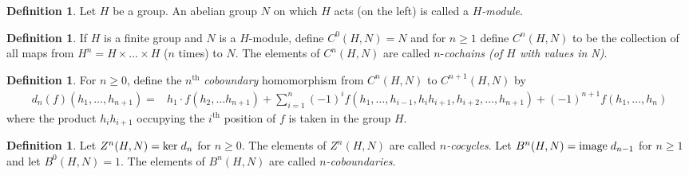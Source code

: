 \documentclass{article}
\newcommand{\Z}{\mathbb{Z}}
\renewcommand{\ker}[1]{\text{ker} \hspace{1mm} #1}
\newcommand{\image}[1]{\text{image} \hspace{1mm} #1}
\theoremstyle{definition}
\newtheorem{defn}[theorem]{Definition}
\begin{document}



\begin{defn}
    Let $H$ be a group. An abelian group $N$ on which $H$ acts (on the left) is called a \emph{$H$-module}.
\end{defn}

\begin{defn}
    If $H$ is a finite group and $N$ is a $H$-module, define $C^0(H,N) = N$ and for $n \geq 1$ define $C^n(H,N)$ to be the collection of all maps from $H^n = H \times \ldots \times H$ ($n$ times) to $N$. The elements of $C^n(H,N)$ are called $n$-\emph{cochains (of $H$ with values in N)}. 
\end{defn}

\begin{defn}
    For $n \geq 0$, define the $n^{\text{th}}$ \emph{coboundary} homomorphism from $C^n(H,N)$ to $C^{n+1}(H,N)$ by 
    \begin{align*}
        d_n(f)(h_1, \ldots , h_{n+1}) =& h_1 \cdot f(h_2, \ldots h_{n+1}) + \sum_{i = 1}^n (-1)^i f(h_1, \ldots, h_{i - 1}, h_i h_{i+1}, h_{i+2}, \ldots , h_{n+1}) + (-1)^{n+1} f(h_1, \ldots , h_n)
    \end{align*}
    where the product $h_i h_{i +1}$ occupying the $i^{\text{th}}$ position of $f$ is taken in the group $H$. 
\end{defn}

\begin{defn}
       Let $Z^n(H,N) = \ker{d_n}$ for $n \geq 0$. The elements of $Z^n(H,N)$ are called \emph{$n$-cocycles}. 
         Let $B^n(H,N) = \image{d_{n-1}}$ for $n \geq 1$ and let $B^0(H,N) = 1$. The elements of $B^n(H,N)$ are called \emph{$n$-coboundaries}. 
\end{defn}
\end{document}
